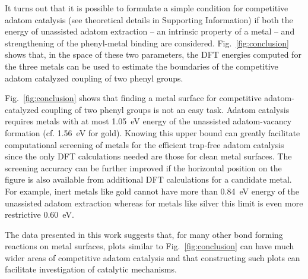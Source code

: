 \documentclass[aps,prb,reprint,amsmath,amssymb]{revtex4-1}
\newcommand{\comm}{\color{green}} %
\newcommand{\sinfo}{Supporting Information}
\begin{document}
It turns out that it is possible to formulate a simple condition for competitive adatom catalysis (see theoretical details in \sinfo) if both the energy of unassisted adatom extraction -- an intrinsic property of a metal -- and strengthening of the phenyl-metal binding are considered. 
Fig.~\ref{fig:conclusion} shows that, in the space of these two parameters, the DFT energies computed for the three metals can be used to estimate the boundaries of the competitive adatom catalyzed coupling of two phenyl groups.

Fig.~\ref{fig:conclusion} shows that finding a metal surface for competitive adatom-catalyzed coupling of two phenyl groups is not an easy task. Adatom catalysis requires metals with at most \SI{1.05}{\electronvolt} energy of the unassisted adatom-vacancy formation (cf. \SI{1.56}{\electronvolt} for gold). Knowing this upper bound can greatly facilitate computational screening of metals for the efficient trap-free adatom catalysis since the only DFT calculations needed are those for clean metal surfaces. The screening accuracy can be further improved if the horizontal position on the figure is also available from additional DFT calculations for a candidate metal. For example, inert metals like gold cannot have more than \SI{0.84}{\electronvolt} energy of the unassisted adatom extraction whereas for metals like silver this limit is even more restrictive \SI{0.60}{\electronvolt}. 


The data presented in this work suggests that, for many other bond forming reactions on metal surfaces, plots similar to Fig.~\ref{fig:conclusion} can have much wider areas of competitive adatom catalysis and that constructing such plots can facilitate investigation of catalytic mechanisms. 


\end{document}
